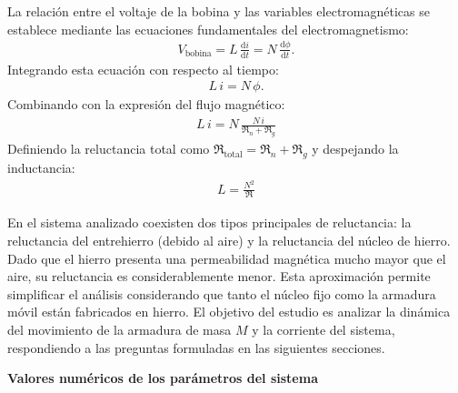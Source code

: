 \documentclass[
  11pt,
  letterpaper,
   addpoints,
  ]{exam}
\newcommand{\Rel}{\mathfrak{R}} %
\begin{document}
La relación entre el voltaje de la bobina y las variables electromagnéticas se establece mediante las ecuaciones fundamentales del electromagnetismo:
\begin{align}
  V_{\text{bobina}} = L\,\frac{\mathrm{d}i}{\mathrm{d}t} = N\,\frac{\mathrm{d}\phi}{\mathrm{d}t}.
\end{align}
Integrando esta ecuación con respecto al tiempo:
\begin{align}
  L\,i = N\,\phi.
\end{align}
Combinando con la expresión del flujo magnético:
\begin{align}
  L\,i = N\, \frac{N\, i}{\Rel_n + \Rel_g}
\end{align}
Definiendo la reluctancia total como $\Rel_{\text{total}} = \Rel_n + \Rel_g$ y despejando la inductancia:
\begin{align}
  L = \frac{N^2}{\Rel}
\end{align}

En el sistema analizado coexisten dos tipos principales de reluctancia: la reluctancia del entrehierro (debido al aire) y la reluctancia del núcleo de hierro. Dado que el hierro presenta una permeabilidad magnética mucho mayor que el aire, su reluctancia es considerablemente menor. Esta aproximación permite simplificar el análisis considerando que tanto el núcleo fijo como la armadura móvil están fabricados en hierro. El objetivo del estudio es analizar la dinámica del movimiento de la armadura de masa $M$ y la corriente del sistema, respondiendo a las preguntas formuladas en las siguientes secciones.
\newpage
\hrulefill
\begin{center}
\textbf{Valores numéricos de los parámetros del sistema}
\end{center}
\end{document}

